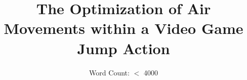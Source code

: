 \documentclass[a4paper,12pt]{article}
\title{The Optimization of Air Movements within a Video Game Jump Action}
\author{Word Count: $<$ 4000}
\date{}
\begin{document}
    \maketitle

    \newpage

    \newpage

    \tableofcontents

    \newpage



\newpage

\newpage

\newpage

\newpage


\nocite{*}
\newpage
\printbibliography
\end{document}
